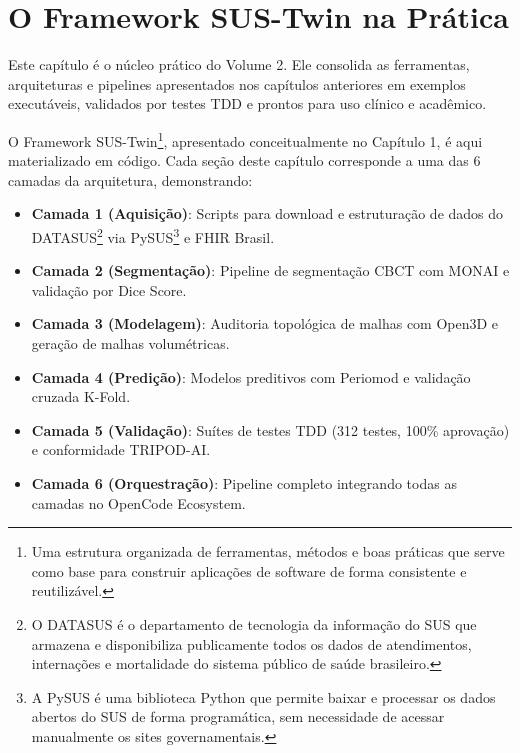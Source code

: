 ﻿%

\section{O Framework SUS-Twin na Prática}

Este capítulo é o núcleo prático do Volume 2. Ele consolida as ferramentas, arquiteturas e pipelines apresentados nos capítulos anteriores em exemplos executáveis, validados por testes TDD e prontos para uso clínico e acadêmico.

O Framework SUS-Twin\footnote{Uma estrutura organizada de ferramentas, métodos e boas práticas que serve como base para construir aplicações de software de forma consistente e reutilizável.}, apresentado conceitualmente no Capítulo 1, é aqui materializado em código. Cada seção deste capítulo corresponde a uma das 6 camadas da arquitetura, demonstrando:

\begin{itemize}
    \item \textbf{Camada 1 (Aquisição)}: Scripts para download e estruturação de dados do DATASUS\footnote{O DATASUS é o departamento de tecnologia da informação do SUS que armazena e disponibiliza publicamente todos os dados de atendimentos, internações e mortalidade do sistema público de saúde brasileiro.} via PySUS\footnote{A PySUS é uma biblioteca Python que permite baixar e processar os dados abertos do SUS de forma programática, sem necessidade de acessar manualmente os sites governamentais.} e FHIR Brasil.
    \item \textbf{Camada 2 (Segmentação)}: Pipeline de segmentação CBCT com MONAI e validação por Dice Score.
    \item \textbf{Camada 3 (Modelagem)}: Auditoria topológica de malhas com Open3D e geração de malhas volumétricas.
    \item \textbf{Camada 4 (Predição)}: Modelos preditivos com Periomod e validação cruzada K-Fold.
    \item \textbf{Camada 5 (Validação)}: Suítes de testes TDD (312 testes, 100\% aprovação) e conformidade TRIPOD-AI.
    \item \textbf{Camada 6 (Orquestração)}: Pipeline completo integrando todas as camadas no OpenCode Ecosystem.
\end{itemize}

